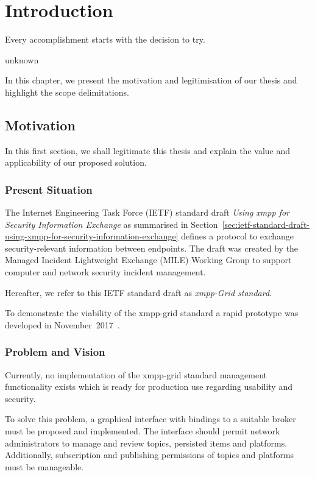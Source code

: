 \newcommand{\code}{\texttt}
\chapter{Introduction}
\label{sec:introduction}

\epigraph{Every accomplishment starts with the decision to try.}{unknown}
In this chapter, we present the motivation and legitimisation of our thesis and highlight the scope delimitations.

\section{Motivation}
In this first section, we shall legitimate this thesis and explain the value and applicability of our proposed solution.

\subsection{Present Situation}
The Internet Engineering Task Force (IETF) standard draft \emph{Using \gls{xmpp} for Security Information Exchange} \cite{ietf-mile-xmpp-grid-05} as summarised in Section~\ref{sec:ietf-standard-draft-using-xmpp-for-security-information-exchange} defines a protocol to exchange security-relevant information between endpoints.
The draft was created by the Managed Incident Lightweight Exchange (MILE) Working Group to support computer and network security incident management.

Hereafter, we refer to this IETF standard draft as \emph{\gls{xmpp}-Grid standard}.

To demonstrate the viability of the \gls{xmpp-grid} standard a rapid prototype was developed in November~2017~\cite{xmpp-grid-prototype}.

\subsection{Problem and Vision}
Currently, no implementation of the \gls{xmpp-grid} standard management functionality exists which is ready for production use regarding usability and security.

To solve this problem, a graphical interface with bindings to a suitable \gls{broker} must be proposed and implemented.
The interface should permit network administrators to manage and review \glspl{topic}, persisted items and \glspl{platform}.
Additionally, subscription and publishing permissions of \glspl{topic} and \glspl{platform} must be manageable.

